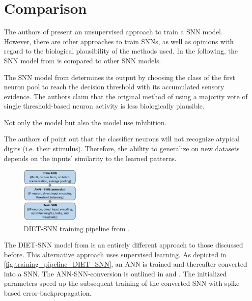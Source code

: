 \section{Comparison}
\label{sec:comparison}

The authors of \cite{SNN}  present an unsupervised approach to train a \ac{SNN} model.
However, there are other approaches to train \acp{SNN}, as well as opinions with regard to the biological plausibility of the methods used.
In the following, the \ac{SNN} model from \cite{SNN} is compared to other \ac{SNN} models.


The \ac{SNN} model from \cite{STDP_like} determines its output by 
choosing the class of the first neuron pool to reach the decision threshold with its accumulated sensory evidence.
The authors claim that the original method of using a majority vote of single threshold-based neuron activity is less biologically plausible.

Not only the \cite{STDP_like} model but also the \cite{SNN} model use inhibition.

The authors of \cite{STDP_like} point out that the classifier neurons will not recognize atypical digits (i.e. their stimulus).
Therefore, the ability to generalize on new datasets depends on the inputs' similarity to the learned patterns.



\begin{figure}
    \centering
    \vspace{-20pt}
    \includegraphics[width=0.25\textwidth]{pictures/DIET_SNN_pipeline.jpg}
    \caption{\acs{DIET}-\ac{SNN} training pipeline from \cite{DIET_SNN}.}
    \label{fig:training_pipeline_DIET_SNN}
\end{figure}

The \ac{DIET}-\ac{SNN} model from \cite{DIET_SNN} is an entirely different approach to those discussed before.
This alternative approach uses supervised learning.
As depicted in \autoref{fig:training_pipeline_DIET_SNN}, an \ac{ANN} is trained and thereafter converted into a \ac{SNN}.
The \ac{ANN}-\ac{SNN}-conversion is outlined in \cite{DIET_SNN} and \cite{ANN_SNN_conversion}.
The initialized parameters speed up the subsequent training of the converted \ac{SNN} with spike-based error-backpropagation.

